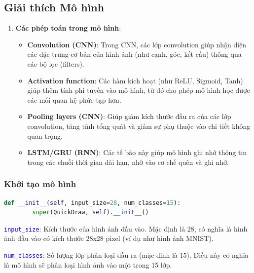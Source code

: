 \subsection{Giải thích Mô hình}

\begin{enumerate}
    \item[] \textbf{Các phép toán trong mô hình}:
    
    \begin{itemize}
        \item \textbf{Convolution (CNN)}: Trong CNN, các lớp convolution giúp nhận diện các đặc trưng cơ bản của hình ảnh (như cạnh, góc, kết cấu) thông qua các bộ lọc (filters).
        \item \textbf{Activation function}: Các hàm kích hoạt (như ReLU, Sigmoid, Tanh) giúp thêm tính phi tuyến vào mô hình, từ đó cho phép mô hình học được các mối quan hệ phức tạp hơn.
        \item \textbf{Pooling layers (CNN)}: Giúp giảm kích thước đầu ra của các lớp convolution, tăng tính tổng quát và giảm sự phụ thuộc vào chi tiết không quan trọng.
        \item \textbf{LSTM/GRU (RNN)}: Các tế bào này giúp mô hình ghi nhớ thông tin trong các chuỗi thời gian dài hạn, nhờ vào cơ chế quên và ghi nhớ.
    \end{itemize}

\end{enumerate}

\subsubsection{Khởi tạo mô hình}

\begin{lstlisting}[language=python]
    def __init__(self, input_size=28, num_classes=15):
        super(QuickDraw, self).__init__()
\end{lstlisting}


\textcolor{blue}{\texttt{input\_size}}: Kích thước của hình ảnh đầu vào. Mặc định là 28, có nghĩa là hình ảnh đầu vào có kích thước 28x28 pixel (ví dụ như hình ảnh MNIST).

\textcolor{blue}{\texttt{num\_classes}}: Số lượng lớp phân loại đầu ra (mặc định là 15). Điều này có nghĩa là mô hình sẽ phân loại hình ảnh vào một trong 15 lớp.

